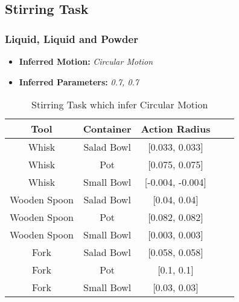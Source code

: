 \subsection{Stirring Task}

\subsubsection{Liquid, Liquid and Powder}

\begin{itemize}
    \item \textbf{Inferred Motion:} \textit{Circular Motion}
    \item \textbf{Inferred Parameters:} \textit{0.7, 0.7}
\end{itemize}
\begin{table}[H]
    \centering
    \begin{tabular}{|c|c|c|c|c|}
      \hline
      \textbf{Tool} & \textbf{Container} & \textbf{Action Radius}\\
      \hline
      Whisk & Salad Bowl & [0.033, 0.033] \\
      \hline
      Whisk & Pot & [0.075, 0.075] \\
      \hline
      Whisk & Small Bowl & [-0.004, -0.004]\\
      \hline
      Wooden Spoon & Salad Bowl & [0.04, 0.04] \\
      \hline
      Wooden Spoon & Pot & [0.082, 0.082] \\
      \hline
      Wooden Spoon & Small Bowl & [0.003, 0.003] \\
      \hline
      Fork & Salad Bowl & [0.058, 0.058] \\
      \hline
      Fork & Pot & [0.1, 0.1] \\
      \hline
      Fork & Small Bowl & [0.03, 0.03] \\
      \hline
    \end{tabular}
    \caption{Stirring Task which infer Circular Motion}
    
  \end{table}

